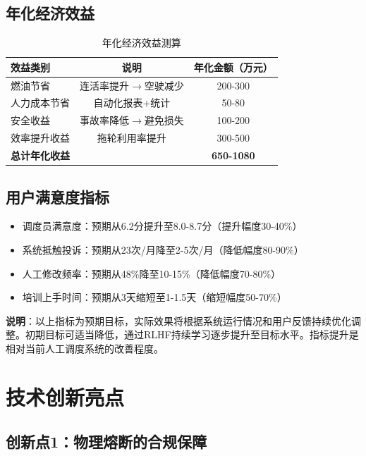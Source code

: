 \documentclass[12pt,a4paper]{article}
\begin{document}
\subsection{年化经济效益}

\begin{table}[h]
\centering
\begin{tabular}{lcc}
\toprule
\textbf{效益类别} & \textbf{说明} & \textbf{年化金额（万元）} \\
\midrule
燃油节省 & 连活率提升$\rightarrow$空驶减少 & 200-300 \\
人力成本节省 & 自动化报表+统计 & 50-80 \\
安全收益 & 事故率降低$\rightarrow$避免损失 & 100-200 \\
效率提升收益 & 拖轮利用率提升 & 300-500 \\
\midrule
\rowcolor{yellow!20}
\textbf{总计年化收益} &  & \textbf{650-1080} \\
\bottomrule
\end{tabular}
\caption{年化经济效益测算}
\end{table}

\subsection{用户满意度指标}

\begin{itemize}[leftmargin=*]
    \item 调度员满意度：预期从6.2分提升至8.0-8.7分（提升幅度30-40\%）
    \item 系统抵触投诉：预期从23次/月降至2-5次/月（降低幅度80-90\%）
    \item 人工修改频率：预期从48\%降至10-15\%（降低幅度70-80\%）
    \item 培训上手时间：预期从3天缩短至1-1.5天（缩短幅度50-70\%）
\end{itemize}

\textbf{说明}：以上指标为预期目标，实际效果将根据系统运行情况和用户反馈持续优化调整。初期目标可适当降低，通过RLHF持续学习逐步提升至目标水平。指标提升是相对当前人工调度系统的改善程度。

\section{技术创新亮点}

\subsection{创新点1：物理熔断的合规保障}
\end{document}
